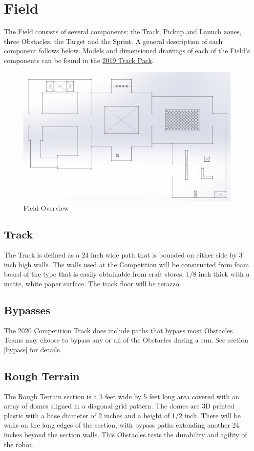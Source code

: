 \section{Field}
The Field consists of several components; the Track, Pickup and Launch zones, three Obstacles, the Target and the Sprint. A general description of each component follows below. Models and dimensioned drawings of each of the Field’s components can be found in the {\href{https://mercury.okstate.edu/content/mercury-challenge}{2019 Track Pack}}.

\begin{figure}[H]
	\centering
	\includegraphics[width=.85\textwidth]{images/track_overview_wlabels.png}
	\caption{Field Overview}
	\label{fig:field} 
\end{figure}

\subsection{Track}
The Track is defined as a 24 inch wide path that is bounded on either side by 3 inch high walls. The walls used at the Competition will be constructed from foam board of the type that is easily obtainable from craft stores; 1/8 inch thick with a matte, white paper surface. The track floor will be terazzo.

\subsection{Bypasses}
The 2020 Competition Track does include paths that bypass most Obstacles. Teams may choose to bypass any or all of the Obstacles during a run. See section \ref{bypass} for details.

\subsection{Rough Terrain}
The Rough Terrain section is a 3 feet wide by 5 feet long area covered with an array of domes aligned in a diagonal grid pattern. The domes are 3D printed plastic with a base diameter of 2 inches and a height of 1/2 inch. There will be walls on the long edges of the section, with bypass paths extending another 24 inches beyond the section walls. This Obstacles tests the durability and agility of the robot.

